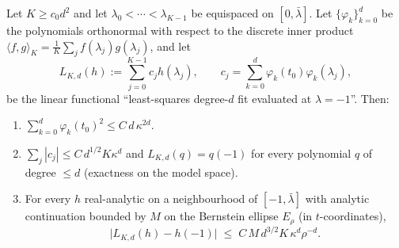 \begin{lemma}\label{app:lem:extrap}
Let $K\ge c_0d^2$ and let $\lambda_0<\cdots<\lambda_{K-1}$ be equispaced
on $[0,\bar\lambda]$. Let $\{\varphi_k\}_{k=0}^{d}$ be the polynomials
orthonormal with respect to the discrete inner product
$\langle f,g\rangle_K=\frac1K\sum_jf(\lambda_j)g(\lambda_j)$, and let
\[
  L_{K,d}(h):=\sum_{j=0}^{K-1}c_jh(\lambda_j),
  \qquad
  c_j=\sum_{k=0}^{d}\varphi_k(t_0)\varphi_k(\lambda_j),
\]
be the linear functional ``least-squares degree-$d$ fit evaluated at
$\lambda=-1$''. Then:
\begin{enumerate}\itemsep2pt
\item[(i)] $\displaystyle\sum_{k=0}^{d}\varphi_k(t_0)^2\le C\,d\,\kappa^{2d}$.
\item[(ii)] $\displaystyle\sum_j|c_j|\le C\,d^{1/2}K\kappa^{d}$ and
      $L_{K,d}(q)=q(-1)$ for every polynomial $q$ of degree $\le d$
      (exactness on the model space).
\item[(iii)] For every $h$ real-analytic on a neighbourhood of
      $[-1,\bar\lambda]$ with analytic continuation bounded by $M$ on the
      Bernstein ellipse $E_\rho$ (in $t$-coordinates),
      \[
        \bigl|L_{K,d}(h)-h(-1)\bigr|\;\le\;C\,M\,d^{3/2}K\,\kappa^{d}\rho^{-d}.
      \]
\end{enumerate}
\end{lemma}

